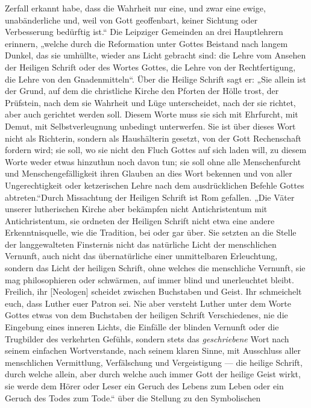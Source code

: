Zerfall erkannt habe, dass die Wahrheit nur eine, und zwar eine ewige, unabänderliche und, weil von Gott geoffenbart, keiner Sichtung oder Verbesserung bedürftig ist.“ Die Leipziger Gemeinden an drei Hauptlehrern erinnern, „welche durch die Reformation unter Gottes Beistand nach langem Dunkel, das sie umhüllte, wieder ans Licht gebracht sind: die Lehre vom Ansehen der Heiligen Schrift oder des Wortes Gottes, die Lehre von der Rechtfertigung, die Lehre von den Gnadenmitteln“. Über die Heilige Schrift sagt er: „Sie allein ist der Grund, auf dem die christliche Kirche den Pforten der Hölle trost, der Prüfstein, nach dem sie Wahrheit und Lüge unterscheidet, nach der sie richtet, aber auch gerichtet werden soll. Diesem Worte muss sie sich mit Ehrfurcht, mit Demut, mit Selbstverleugnung unbedingt unterwerfen. Sie ist über dieses Wort nicht als Richterin, sondern als Haushälterin gesetzt, von der Gott Rechenschaft fordern wird; sie soll, wo sie nicht den Fluch Gottes auf sich laden will, zu diesem Worte weder etwas hinzuthun noch davon tun; sie soll ohne alle Menschenfurcht und Menschengefälligkeit ihren Glauben an dies Wort bekennen und von aller Ungerechtigkeit oder ketzerischen Lehre nach dem ausdrücklichen Befehle Gottes abtreten.“Durch Missachtung der Heiligen Schrift ist Rom gefallen. „Die Väter unserer lutherischen Kirche aber bekämpfen nicht Antichristentum mit Antichristentum, sie ordneten der Heiligen Schrift nicht etwa eine andere Erkenntnisquelle, wie die Tradition, bei oder gar über. Sie setzten an die Stelle der langgewalteten Finsternis nicht das natürliche Licht der menschlichen Vernunft, auch nicht das übernatürliche einer unmittelbaren Erleuchtung, sondern das Licht der heiligen Schrift, ohne welches die menschliche Vernunft, sie mag philosophieren oder schwärmen, auf immer blind und unerleuchtet bleibt. Freilich, ihr [Neologen] scheidet zwischen Buchstaben und Geist. Ihr schmeichelt euch, dass Luther euer Patron sei. Nie aber versteht Luther unter dem Worte Gottes etwas von dem Buchstaben der heiligen Schrift Verschiedenes, nie die Eingebung eines inneren Lichts, die Einfälle der blinden Vernunft oder die Trugbilder des verkehrten Gefühls, sondern stets das \emph{geschriebene} Wort nach seinem einfachen Wortverstande, nach seinem klaren Sinne, mit Ausschluss aller menschlichen Vermittlung, Verfälschung und Vergeistigung --- die heilige Schrift, durch welche allein, aber durch welche auch immer Gott der heilige Geist wirkt, sie werde dem Hörer oder Leser ein Geruch des Lebens zum Leben oder ein Geruch des Todes zum Tode.“ über die Stellung zu den Symbolischen